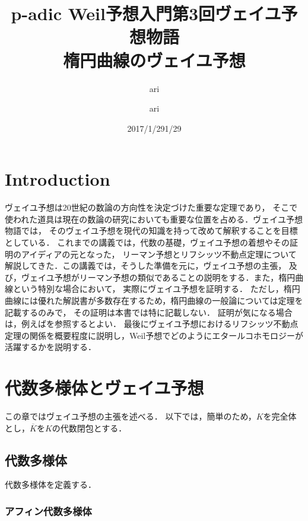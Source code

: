 \documentclass{ujarticle}
\author{ari}
\title{p-adic Weil予想入門}
\date{2017/1/29}
\title{第3回ヴェイユ予想物語 \\ ~楕円曲線のヴェイユ予想~}
\author{ari}
\date{1/29}
\newtheorem*{yodan}{余談，疑問}
\begin{document}
\maketitle
\tableofcontents

\section{Introduction}
\label{sec:Introduction}

ヴェイユ予想は20世紀の数論の方向性を決定づけた重要な定理であり，
そこで使われた道具は現在の数論の研究においても重要な位置を占める．ヴェイユ予想物語では，
そのヴェイユ予想を現代の知識を持って改めて解釈することを目標としている．
これまでの講義では，代数の基礎，ヴェイユ予想の着想やその証明のアイディアの元となった，
リーマン予想とリフシッツ不動点定理について解説してきた．この講義では，そうした準備を元に，ヴェイユ予想の主張，
及び，ヴェイユ予想がリーマン予想の類似であることの説明をする．また，楕円曲線という特別な場合において，
実際にヴェイユ予想を証明する．
ただし，楕円曲線には優れた解説書が多数存在するため，楕円曲線の一般論については定理を記載するのみで，
その証明は本書では特に記載しない．
証明が気になる場合は，例えば\cite{S}を参照するとよい．
最後にヴェイユ予想におけるリフシッツ不動点定理の関係を概要程度に説明し，Weil予想でどのようにエタールコホモロジーが活躍するかを説明する．

\section{代数多様体とヴェイユ予想}
\label{sec:代数多様体とヴェイユ予想}
この章ではヴェイユ予想の主張を述べる．
以下では，簡単のため，$K$を完全体とし，$\overline{K}$を$K$の代数閉包とする．

\subsection{代数多様体}
\label{sub:代数多様体}
代数多様体を定義する．
\subsubsection{アフィン代数多様体}
\label{subs:アフィン代数多様体}
\end{document}
